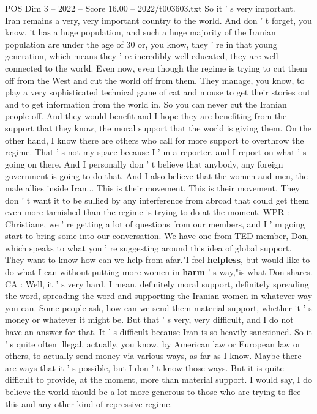 \begin{textsample}{POS Dim 3 – 2022 – Score 16.00 – 2022/t003603.txt}
So it ' s very important.
Iran remains a very, very important country to the world.
And don ' t forget, you know, it has a huge population, and such a huge majority of the Iranian population are under the age of 30 or, you know, they ' re in that young generation, which means they ' re incredibly well-educated, they are well-connected to the world.
Even now, even though the regime is trying to cut them off from the West and cut the world off from them.
They manage, you know, to play a very sophisticated technical game of cat and mouse to get their stories out and to get information from the world in.
So you can never cut the Iranian people off.
And they would benefit and I hope they are benefiting from the support that they know, the moral support that the world is giving them.
On the other hand, I know there are others who call for more support to overthrow the regime.
That ' s not my space because I ' m a reporter, and I report on what ' s going on there.
And I personally don ' t believe that anybody, any foreign government is going to do that.
And I also believe that the women and men, the male allies inside Iran...
This is their movement.
This is their movement.
They don ' t want it to be sullied by any interference from abroad that could get them even more tarnished than the regime is trying to do at the moment.
WPR : Christiane, we ' re getting a lot of questions from our members, and I ' m going start to bring some into our conversation.
We have one from TED member, Don, which speaks to what you ' re suggesting around this idea of global support.
They want to know how can we help from afar."I feel \textbf{helpless}, but would like to do what I can without putting more women in \textbf{harm} ' s way,"is what Don shares.
CA : Well, it ' s very hard.
I mean, definitely moral support, definitely spreading the word, spreading the word and supporting the Iranian women in whatever way you can.
Some people ask, how can we send them material support, whether it ' s money or whatever it might be.
But that ' s very, very difficult, and I do not have an answer for that.
It ' s difficult because Iran is so heavily sanctioned.
So it ' s quite often illegal, actually, you know, by American law or European law or others, to actually send money via various ways, as far as I know.
Maybe there are ways that it ' s possible, but I don ' t know those ways.
But it is quite difficult to provide, at the moment, more than material support.
I would say, I do believe the world should be a lot more generous to those who are trying to flee this and any other kind of repressive regime.

\end{textsample}
